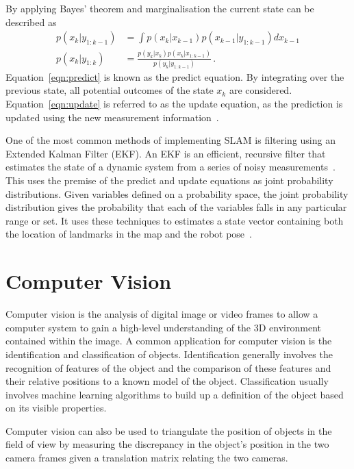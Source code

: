 By applying Bayes' theorem and marginalisation the current state can be described as
\begin{align}
\label{eqn:predict}
p(x_{k} | y_{1:k-1}) & = \int p(x_{k}|x_{k-1}) p(x_{k-1} | y_{1:k-1}) dx_{k-1} \\
\label{eqn:update}
p(x_{k} | y_{1:k}) &= \frac{ p(y_{k}|x_{k})p(x_{k}|x_{1:k-1})}{ p(y_{k}|y_{1:k-1})}\,.
\end{align}
Equation~\ref{eqn:predict} is known as the predict equation. By integrating over
the previous state, all potential outcomes of the state $x_k$ are
considered. Equation~\ref{eqn:update} is referred to as the update equation,
as the prediction is updated using the new measurement information~\cite{kam1997sensorfusion}.

One of the most common methods of implementing SLAM is filtering using an
Extended Kalman Filter (EKF). An EKF is an efficient, recursive filter
that estimates the state of a dynamic system from a series of noisy measurements~\cite{fox2003bayesian}.
This uses the premise of the predict and update equations as joint probability
distributions. Given variables defined on a probability space, the joint
probability distribution gives the probability that each of the variables falls in any
particular range or set. It uses these techniques to estimates a state vector containing
both the location of landmarks in the map and the robot pose~\cite{huang2007convergence}.


\section{Computer Vision}\label{litreview/cv}
Computer vision is the analysis of digital image or video frames to allow a computer
system to gain a high-level understanding of the 3D environment contained within
the image\cite{CVBallard}. A common application for computer vision is the identification and classification
of objects. Identification generally involves the recognition of features of the
object and the comparison of these features and their relative positions to a
known model of the object. Classification usually involves machine learning
algorithms to build up a definition of the object based on its visible properties\cite{CVpaoletti2018new}.

Computer vision can also be used to triangulate the position of objects in the
field of view by measuring the discrepancy in the object's position in the two camera
frames given a translation matrix relating the two cameras.

